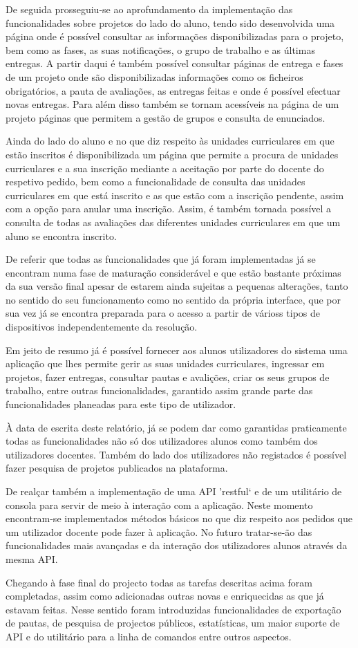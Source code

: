 De seguida prosseguiu-se ao aprofundamento da implementação das funcionalidades sobre projetos do lado do aluno, tendo sido desenvolvida uma página onde é possível consultar as informações disponibilizadas para o projeto, bem como as fases, as suas notificações, o grupo de trabalho e as últimas entregas.
A partir daqui é também possível consultar páginas de entrega e fases de um projeto onde são disponibilizadas informações como os ficheiros obrigatórios, a pauta de avaliações, as entregas feitas e onde é possível efectuar novas entregas.
Para além disso também se tornam acessíveis na página de um projeto páginas que permitem a gestão de grupos e consulta de enunciados.

Ainda do lado do aluno e no que diz respeito às unidades curriculares em que estão inscritos é disponibilizada um página que permite a procura de unidades curriculares e a sua inscrição mediante a aceitação por parte do docente do respetivo pedido, bem como a funcionalidade de consulta das unidades curriculares em que está inscrito e as que estão com a inscrição pendente, assim com a opção para anular uma inscrição.
Assim, é também tornada possível a consulta de todas as avaliações das diferentes unidades curriculares em que um aluno se encontra inscrito.

De referir que todas as funcionalidades que já foram implementadas já se encontram numa fase de maturação considerável e que estão bastante próximas da sua versão final apesar de estarem ainda sujeitas a pequenas alterações, tanto no sentido do seu funcionamento como no sentido da própria interface, que por sua vez já se encontra preparada para o acesso a partir de várioss tipos de dispositivos independentemente da resolução.

Em jeito de resumo já é possível fornecer aos alunos utilizadores do sistema uma aplicação que lhes permite gerir as suas unidades curriculares, ingressar em projetos, fazer entregas, consultar pautas e avalições, criar os seus grupos de trabalho, entre outras funcionalidades, garantido assim grande parte das funcionalidades planeadas para este tipo de utilizador.

À data de escrita deste relatório, já se podem dar como garantidas praticamente todas as funcionalidades não só dos utilizadores alunos como também dos utilizadores docentes. Também do lado dos utilizadores não registados é possível fazer pesquisa de projetos publicados na plataforma.

De realçar também a implementação de uma API 'restful` e de um utilitário de consola para servir de meio à interação com a aplicação. Neste momento encontram-se implementados métodos básicos no que diz respeito aos pedidos que um utilizador docente pode fazer à aplicação. No futuro tratar-se-ão das funcionalidades mais avançadas e da interação dos utilizadores alunos através da mesma API.

Chegando à fase final do projecto todas as tarefas descritas acima foram 
completadas, assim como adicionadas outras novas e enriquecidas as que já 
estavam feitas. Nesse sentido foram introduzidas  funcionalidades de exportação de pautas, 
de pesquisa de projectos públicos, estatísticas, um maior suporte de API e do 
utilitário para a linha de comandos entre outros aspectos.
\newpage
